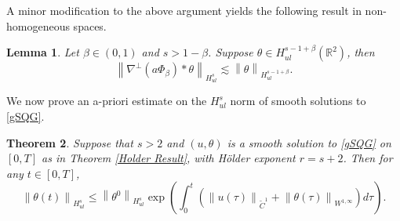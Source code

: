 \documentclass[12pt,xcolor=svgnames]{amsart}
\newtheorem{theorem}{Theorem}[section]
\newtheorem{lemma}[theorem]{Lemma}
\newcommand{\R}{\mathbb{R}}
\newcommand{\norm}[2]{\left\lVert#1\right\rVert_{#2}}
\begin{document}
A minor modification to the above argument yields the following result in non-homogeneous spaces.
\begin{lemma}
\label{near field nonhomogeneuous velocity estimate}
Let $\beta \in (0,1)$ and $s>1-\beta$. Suppose $\theta \in H^{s-1+\beta}_{ul}(\R^2)$, then 
$$
\norm{\nabla^{\perp}(a\Phi_{\beta})\ast \theta}{H^{s}_{ul}}\lesssim \norm{\theta}{H^{s-1+\beta}_{ul}}.
$$
\end{lemma}

We now prove an a-priori estimate on the $H^s_{ul}$ norm of smooth solutions to \eqref{gSQG}.
\begin{theorem}
\label{Hsul apriori}
Suppose that $s > 2$ and $(u,\theta)$ is a smooth solution to \eqref{gSQG} on $[0,T]$ as in Theorem \ref{Holder Result}, with Hölder exponent $r=s+2$. Then for any $t \in [0,T]$,
$$
\norm{\theta(t)}{H_{ul}^s}\leq \norm{\theta^0}{H_{ul}^s}\exp{\left(\int_0^t \left(\norm{u(\tau)}{\tilde{C}^1} + \norm{\theta(\tau)}{W^{1,\infty}}\right)d\tau\right)}.
$$
\end{theorem}
\end{document}

